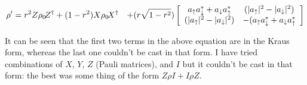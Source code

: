 \documentclass[english]{article}
\DeclarePairedDelimiter\abs{\lvert}{\rvert}
\begin{document}
\begin{equation}
  \begin{aligned}
    \rho^{\prime} = {} & r^{2}Z\rho_{0}\!Z^{\dagger} + (1-r^{2})X\rho_{0}\!X^{\dagger}
                  & + (r\sqrt{1-r^{2}})\left[\begin{array}{cc}a_{\uparrow}a_{\downarrow}^{*}+a_{\downarrow}a_{\uparrow}^{*} & (\abs{a_{\uparrow}}^{2}-\abs{a_{\downarrow}}^{2}) \\
             (\abs{a_{\uparrow}}^{2}-\abs{a_{\downarrow}}^{2}) & -(a_{\uparrow}a_{\downarrow}^{*}+a_{\downarrow}a_{\uparrow}^{*} \end{array}\right]
  \end{aligned}
\end{equation}

It can be seen that the first two terms in the above equation are in the Kraus form, whereas the last one couldn't be cast in that form. I have tried combinations of $X$, $Y$, $Z$ (Pauli matrices), and $I$ but it couldn't be cast in that form: the best was some thing of the form $Z\rho\!I + I\rho\!Z$.
\end{document}
